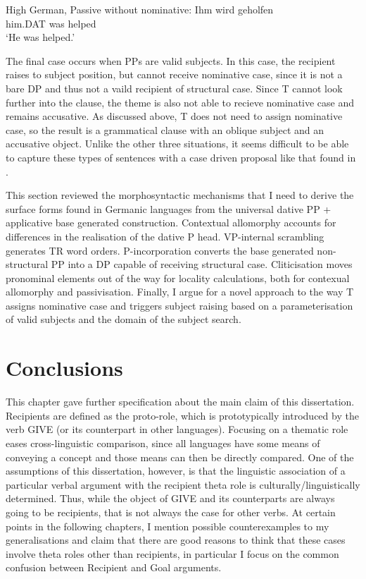 \begin{exe}
	\ex High German, Passive without nominative:
	\gll Ihm wird geholfen\label{ex:german-help-pass}\\
	him.DAT was helped\\
	\trans `He was helped.'
\end{exe}

The final case occurs when PPs are valid subjects. In this case, the recipient raises to subject position, but cannot receive nominative case, since it is not a bare DP and thus not a vaild recipient of structural case. Since T cannot look further into the clause, the theme is also not able to recieve nominative case and remains accusative. As discussed above, T does not need to assign nominative case, so the result is a grammatical clause with an oblique subject and an accusative object. Unlike the other three situations, it seems difficult to be able to capture these types of sentences with a case driven proposal like that found in \citet{McGinnis.1998b}.

This section reviewed the morphosyntactic mechanisms that I need to derive the surface forms found in Germanic languages from the universal dative PP + applicative base generated construction. Contextual allomorphy accounts for differences in the realisation of the dative P head. VP-internal scrambling generates TR word orders. P-incorporation converts the base generated non-structural PP into a DP capable of receiving structural case. Cliticisation moves pronominal elements out of the way for locality calculations, both for contexual allomorphy and passivisation. Finally, I argue for a novel approach to the way T assigns nominative case and triggers subject raising based on a parameterisation of valid subjects and the domain of the subject search.

\section{Conclusions}
This chapter gave further specification about the main claim of this dissertation. Recipients are defined as the proto-role, which is prototypically introduced by the verb GIVE (or its counterpart in other languages). Focusing on a thematic role eases cross-linguistic comparison, since all languages have some means of conveying a concept and those means can then be directly compared. One of the assumptions of this dissertation, however, is that the linguistic association of a particular verbal argument with the recipient theta role is culturally/linguistically determined. Thus, while the object of GIVE and its counterparts are always going to be recipients, that is not always the case for other verbs. At certain points in the following chapters, I mention possible counterexamples to my generalisations and claim that there are good reasons to think that these cases involve theta roles other than recipients, in particular I focus on the common confusion between Recipient and Goal arguments.

